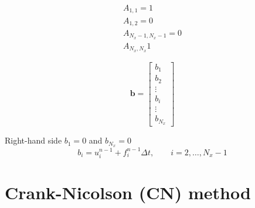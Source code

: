\documentclass[a4paper,11pt]{article}
\begin{document}
\begin{align*}
A_{1,1} = 1 \\
A_{1,2} = 0 \\
A_{N_x-1,N_x-1} = 0 \\
A_{N_x,N_x} 1
\end{align*}

\begin{equation}
\mathbf{b} = \begin{bmatrix}
b_{1} \\
b_{2} \\
\vdots \\
b_{i} \\
\vdots \\
b_{N_x}
\end{bmatrix}
\end{equation}

Right-hand side $b_{1} = 0$ and $b_{N_x} = 0$
\begin{equation}
b_{i} = u^{n-1}_{i} + f_{i}^{n-1} \Delta t, \qquad i = 2, \ldots, N_{x}-1
\end{equation}



\section{Crank-Nicolson (CN) method}
\end{document}
